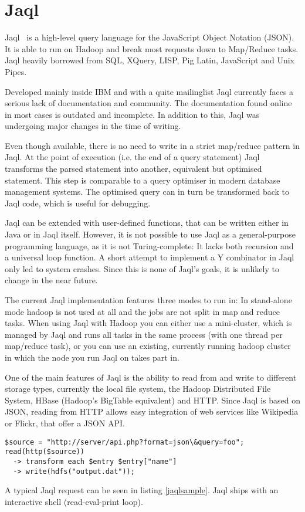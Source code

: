 \section{Jaql}

Jaql~\cite{jaqlWebsite} is a high-level query language for the JavaScript Object Notation (JSON).
It is able to run on Hadoop and break most requests down to Map/Reduce tasks.
Jaql heavily borrowed from SQL, XQuery, LISP, Pig Latin, JavaScript and Unix Pipes.~\cite{jaqlOverview}

Developed mainly inside IBM and with a quite mailinglist Jaql currently faces
a serious lack of documentation and community. The documentation found online in
most cases is outdated and incomplete. In addition to this, Jaql was undergoing
major changes in the time of writing.

Even though available, there is no need to write in a strict map/reduce pattern in
Jaql. At the point of execution (i.e. the end of a query statement) Jaql transforms the
parsed statement into another, equivalent but optimised statement. This step is
comparable to a query optimiser in modern database management systems. The optimised
query can in turn be transformed back to Jaql code, which is useful for debugging.

Jaql can be extended with user-defined functions, that can be written either in Java or
in Jaql itself. However, it is not possible to use Jaql as a general-purpose programming
language, as it is not Turing-complete: It lacks both recursion and a universal loop
function. A short attempt to implement a Y combinator in Jaql only led to system crashes.
Since this is none of Jaql's goals, it is unlikely to change in the near future.

The current Jaql implementation features three modes to run in: In stand-alone mode hadoop
is not used at all and the jobs are not split in map and reduce tasks. When using Jaql
with Hadoop you can either use a mini-cluster, which is managed by Jaql and runs all tasks
in the same process (with one thread per map/reduce task), or you can use an existing,
currently running hadoop cluster in which the node you run Jaql on takes part in.

One of the main features of Jaql is the ability to read from and write to different
storage types, currently the local file system, the Hadoop Distributed File System,
HBase (Hadoop's BigTable equivalent) and HTTP. Since Jaql is based on JSON, reading
from HTTP allows easy integration of web services like Wikipedia or Flickr, that offer
a JSON API.

\begin{lstlisting}[language=jaql,caption=A sample Jaql query,float,label=jaqlsample]
$source = "http://server/api.php?format=json\&query=foo";
read(http($source)) 
  -> transform each $entry $entry["name"]
  -> write(hdfs("output.dat"));
\end{lstlisting}

A typical Jaql request can be seen in listing \ref{jaqlsample}. Jaql ships with an
interactive shell (read-eval-print loop). 